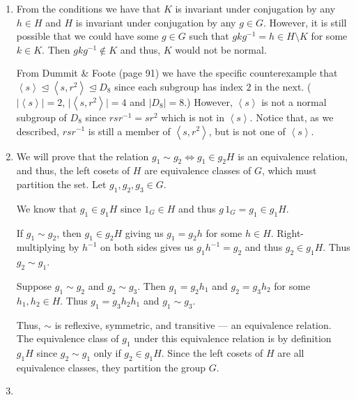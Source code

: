 \documentclass[12 pt, letterpaper]{hmcpset}
\begin{document}
\begin{solution}
	\begin{enumerate}
		\item {} 

			From the conditions we have that $K$ is invariant under conjugation by any $h \in H$ and $H$ is invariant under conjugation by any $g \in G$. However, it is still possible that we could have some $g \in G$ such that $gkg^{-1} = h \in H \setminus K$ for some $k \in K$. Then $gkg^{-1} \notin K$ and thus, $K$ would not be normal. 

			From Dummit \& Foote (page 91) we have the specific counterexample that $\left < s \right > \trianglelefteq \left < s, r^{2} \right > \trianglelefteq D_{8}$ since each subgroup has index $2$ in the next. ($\lvert \left < s \right > \rvert = 2$, $\lvert \left < s, r^{2} \right > \rvert = 4$ and $\lvert D_{8} \rvert = 8$.) However, $\left < s \right >$ is not a normal subgroup of $D_{8}$ since $rsr^{-1} = sr^{2}$ which is not in $\left < s \right >$. Notice that, as we described, $rsr^{-1}$ is still a member of $\left < s, r^{2} \right >$, but is not one of $\left < s \right >$.
		\item {} 

			We will prove that the relation $g_{1} \sim g_2 \iff g_{1} \in g_{2}H$ is an equivalence relation, and thus, the left cosets of $H$ are equivalence classes of $G$, which must partition the set. Let $g_{1}, g_{2}, g_3 \in G$. 

			We know that $g_{1} \in g_{1} H$ since $1_{G} \in H$ and thus $g \, 1_{G} = g_1 \in g_{1}H$. 

			If $g_{1} \sim g_2$, then $g_{1} \in g_{2} H$ giving us $g_{1} = g_{2} h$ for some $h \in H$. Right-multiplying by $h^{-1}$ on both sides gives us $g_{1} h^{-1} = g_{2}$ and thus $g_{2} \in g_{1} H$. Thus $g_{2} \sim g_{1}$. 

			Suppose $g_{1} \sim g_{2}$ and $g_{2} \sim g_{3}$. Then $g_{1} = g_{2} h_{1}$ and $g_{2} = g_{3} h_{2}$ for some $h_{1}, h_{2} \in H$. Thus $g_{1} = g_{3} h_{2} h_{1}$ and $g_{1} \sim g_{3}$. 

			Thus, $\sim$ is reflexive, symmetric, and transitive --- an equivalence relation. The equivalence class of $g_{1}$ under this equivalence relation is by definition $g_{1}H$ since $g_{2} \sim g_{1}$ only if $g_{2} \in g_{1} H$. Since the left cosets of $H$ are all equivalence classes, they partition the group $G$.
		\item {} 


\end{enumerate}
\end{solution}
\end{document}
